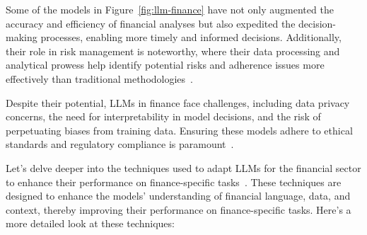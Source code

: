 Some of the models in Figure~\ref{fig:llm-finance} have not only augmented the accuracy and efficiency of financial analyses but also expedited the decision-making processes, enabling more timely and informed decisions.
Additionally, their role in risk management is noteworthy, where their data processing and analytical prowess help identify potential risks and adherence issues more effectively than traditional methodologies~\cite{buehler2018deep}.

Despite their potential, LLMs in finance face challenges, including data privacy concerns, the need for interpretability in model decisions, and the risk of perpetuating biases from training data.
Ensuring these models adhere to ethical standards and regulatory compliance is paramount~\cite{jones2020ethical, buehler2018deep}.

Let's delve deeper into the techniques used to adapt LLMs for the financial sector to enhance their performance on finance-specific tasks~\cite{lee2024survey}.
These techniques are designed to enhance the models' understanding of financial language, data, and context, thereby improving their performance on finance-specific tasks.
Here's a more detailed look at these techniques:

